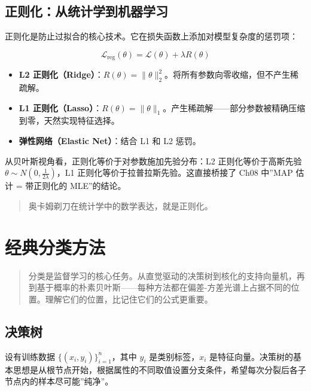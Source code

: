 \documentclass[
]{book}
\providecommand{\tightlist}{%
  \setlength{\itemsep}{0pt}\setlength{\parskip}{0pt}}
\begin{document}
\section{正则化：从统计学到机器学习}\label{ux6b63ux5219ux5316ux4eceux7edfux8ba1ux5b66ux5230ux673aux5668ux5b66ux4e60}

正则化是防止过拟合的核心技术。它在损失函数上添加对模型复杂度的惩罚项：

\[
\mathcal{L}_{\text{reg}}(\theta) = \mathcal{L}(\theta) + \lambda R(\theta)
\]

\begin{itemize}
\tightlist
\item
  \textbf{L2 正则化（Ridge）}：\(R(\theta) = \|\theta\|_2^2\)。将所有参数向零收缩，但不产生稀疏解。
\item
  \textbf{L1 正则化（Lasso）}：\(R(\theta) = \|\theta\|_1\)。产生稀疏解------部分参数被精确压缩到零，天然实现特征选择。
\item
  \textbf{弹性网络（Elastic Net）}：结合 L1 和 L2 惩罚。
\end{itemize}

从贝叶斯视角看，正则化等价于对参数施加先验分布：L2 正则化等价于高斯先验 \(\theta \sim N(0, \frac{1}{2\lambda})\)，L1 正则化等价于拉普拉斯先验。这直接桥接了 Ch08 中''MAP 估计 = 带正则化的 MLE''的结论。

\begin{quote}
奥卡姆剃刀在统计学中的数学表达，就是正则化。
\end{quote}

\chapter{经典分类方法}\label{ux7ecfux5178ux5206ux7c7bux65b9ux6cd5}

\begin{quote}
分类是监督学习的核心任务。从直觉驱动的决策树到核化的支持向量机，再到基于概率的朴素贝叶斯------每种方法都在偏差-方差光谱上占据不同的位置。理解它们的位置，比记住它们的公式更重要。
\end{quote}

\section{决策树}\label{ux51b3ux7b56ux6811}

设有训练数据 \(\{(x_i, y_i)\}_{i=1}^n\)，其中 \(y_i\) 是类别标签，\(x_i\) 是特征向量。决策树的基本思想是从根节点开始，根据属性的不同取值设置分支条件，希望每次分裂后各子节点内的样本尽可能''纯净''。
\end{document}
